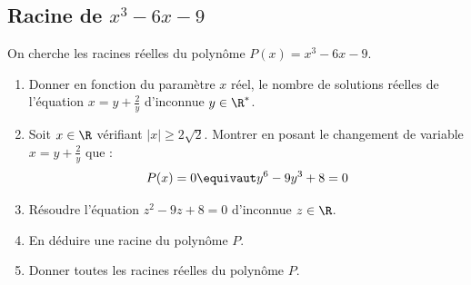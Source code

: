 

\subsection{Racine de $x^3-6x-9$}

\begin{exercice}
On cherche les racines réelles du polynôme $P(x) =x^3-6x-9$. 
\begin{enumerate}
\item Donner en fonction du paramètre $x$ réel, le nombre de solutions réelles de l'équation $x=y+\frac{2}{y}$ d'inconnue $y\in \R^*$. 
\item Soit $x\in \R$ vérifiant $|x|\geq 2\sqrt{2}$. Montrer en posant le changement de variable $x=y+\frac{2}{y}$ que : 
$$ P(x) =0 \equivaut y^6 -9y^3 +8=0$$
\item Résoudre l'équation $z^2-9z+8=0$ d'inconnue $z\in \R$. 
\item En déduire une racine du polynôme $P$.
\item Donner toutes les racines réelles du polynôme $P$. 
\end{enumerate}
\end{exercice}

